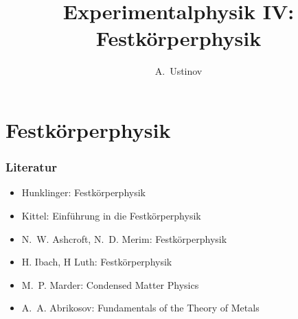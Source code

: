 \documentclass[10pt,a4paper]{article}
\author{A.~Ustinov}
\title{Experimentalphysik IV: Festk\"orperphysik}
\begin{document}
\part{Festk\"orperphysik}

\section*{Literatur}
\begin{itemize}
\item Hunklinger: Festkörperphysik
\item Kittel: Einführung in die Festkörperphysik
\item N.~W. Ashcroft, N.~D. Merim: Festkörperphysik
\item H. Ibach, H Luth: Festkörperphysik
\item M.~P. Marder: Condensed Matter Physics
\item A.~A. Abrikosov: Fundamentals of the Theory of Metals
\end{itemize}

\tableofcontents

\newpage
{}


\end{document}
